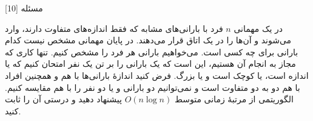 ‌مسئله [10]


% 
%
%
% 

در یک مهمانی $n$ فرد با بارانی‌های مشابه که فقط اندازه‌های متفاوت دارند، وارد می‌شوند و آن‌ها را در یک اتاق قرار می‌دهند. در پایان مهمانی مشخص نیست کدام بارانی برای چه کسی است. می‌خواهیم بارانی هر فرد را مشخص کنیم. تنها کاری که مجاز به انجام آن هستیم، این است که یک بارانی را بر تن یک نفر امتحان کنیم که یا اندازه است، یا کوچک است و یا بزرگ. فرض کنید اندازۀ بارانی‌ها با هم و همچنین افراد با هم دو به دو متفاوت است و نمی‌توانیم دو بارانی و یا دو نفر را با هم مقایسه کنیم. الگوریتمی از مرتبۀ زمانی متوسط $O(n \log n)$ پیشنهاد دهید و درستی آن را ثابت کنید.

